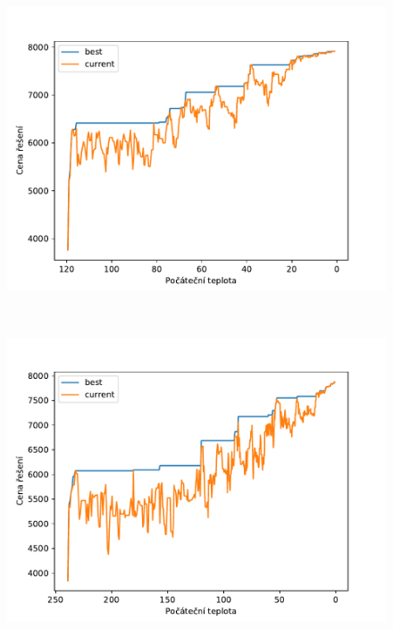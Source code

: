 \documentclass[11pt]{article}
\begin{document}
\begin{figure}
\begin{minipage}[c]{0.325\textwidth}
        \centering \includegraphics[width=\textwidth]{img/T120.pdf} 
    \end{minipage}
    \\
    \begin{minipage}[c]{0.49\textwidth}
        \centering \includegraphics[width=\textwidth]{img/T240.pdf} 
    \end{minipage}
    \begin{minipage}[c]{0.49\textwidth}

\end{minipage}
\end{figure}
\end{document}

